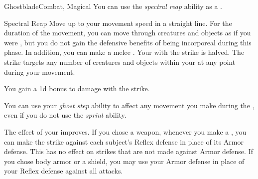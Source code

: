 \begin{feat}{Ghostblade}{Combat, Magical}
         You can use the \textit{spectral reap} ability as a .
        \begin{durationability}{Spectral Reap}
            Move up to your movement speed in a straight line.
            For the duration of the movement, you can move through creatures and objects as if you were , but you do not gain the defensive benefits of being incorporeal during this phase.
            In addition, you can make a melee .
            Your  with the strike is halved.
            The strike targets any number of creatures and objects within your  at any point during your movement.

            \rankline
             You gain a \plus1d bonus to damage with the strike.
        \end{durationability}

         You can use your \textit{ghost step} ability to affect any movement you make during the , even if you do not use the \textit{sprint} ability.

         The effect of your  improves.
        If you chose a weapon, whenever you make a , you can make the strike against each subject's Reflex defense in place of its Armor defense.
        This has no effect on strikes that are not made against Armor defense.
        If you chose body armor or a shield, you may use your Armor defense in place of your Reflex defense against all attacks.
    \end{feat}

